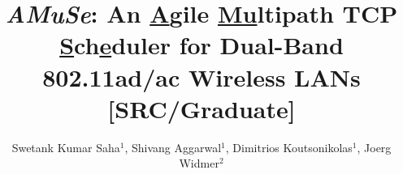 \documentclass[sigconf]{acmart}
\begin{document}
\newcommand{\name}{\emph{AMuSe}\xspace}

\title{\name: An \underline{A}gile \underline{Mu}ltipath TCP \underline{S}ch\underline{e}duler for Dual-Band 802.11ad/ac Wireless LANs [SRC/Graduate]}

\author{Swetank Kumar Saha$^1$, Shivang Aggarwal$^1$, Dimitrios Koutsonikolas$^1$, Joerg Widmer$^2$}

\begin{comment}
\author{Lars Th{\o}rv{\"a}ld}
\authornote{This author is the
  one who did all the really hard work.}
\affiliation{%
  \institution{The Th{\o}rv{\"a}ld Group}
  \streetaddress{1 Th{\o}rv{\"a}ld Circle}
  \city{Hekla}
  \country{Iceland}}
\email{larst@affiliation.org}

\author{Valerie B\'eranger}
\affiliation{%
  \institution{Inria Paris-Rocquencourt}
  \city{Rocquencourt}
  \country{France}
}
\author{Aparna Patel}
\affiliation{%
 \institution{Rajiv Gandhi University}
 \streetaddress{Rono-Hills}
 \city{Doimukh}
 \state{Arunachal Pradesh}
 \country{India}}
\author{Huifen Chan}
\affiliation{%
  \institution{Tsinghua University}
  \streetaddress{30 Shuangqing Rd}
  \city{Haidian Qu}
  \state{Beijing Shi}
  \country{China}
}

\author{Charles Palmer}
\affiliation{%
  \institution{Palmer Research Laboratories}
  \streetaddress{8600 Datapoint Drive}
  \city{San Antonio}
  \state{Texas}
  \postcode{78229}}
\email{cpalmer@prl.com}

\author{John Smith}
\affiliation{\institution{The Th{\o}rv{\"a}ld Group}}
\email{jsmith@affiliation.org}

\author{Julius P.~Kumquat}
\affiliation{\institution{The Kumquat Consortium}}
\email{jpkumquat@consortium.net}
\end{comment}

\renewcommand{\shortauthors}{B. Trovato et al.}
\renewcommand\footnotetextcopyrightpermission[1]{}
\end{document}
